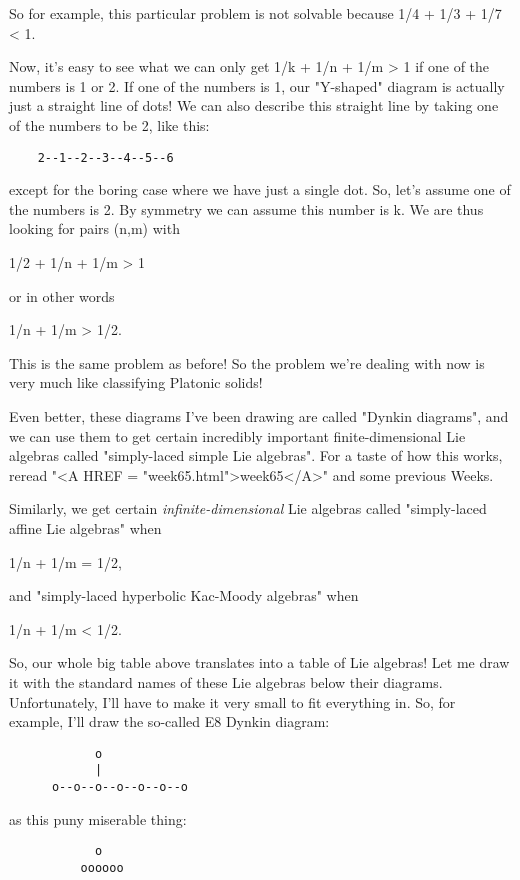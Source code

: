 So for example, this particular problem is not solvable because
1/4 + 1/3 + 1/7 < 1.

Now, it's easy to see what we can only get 1/k + 1/n + 1/m > 1 if one 
of the numbers is 1 or 2.  If one of the numbers is 1, our "Y-shaped"
diagram is actually just a straight line of dots!  We can also
describe this straight line by taking one of the numbers to be 2, like
this:
\begin{verbatim}
    2--1--2--3--4--5--6
\end{verbatim}
    
except for the boring case where we have just a single dot.  So, 
let's assume one of the numbers is 2.  By symmetry we can assume
this number is k.  We are thus looking for pairs (n,m) with 

1/2 + 1/n + 1/m > 1

or in other words

1/n + 1/m > 1/2.

This is the same problem as before!  So the problem we're dealing
with now is very much like classifying Platonic solids!  

Even better, these diagrams I've been drawing are called "Dynkin
diagrams", and we can use them to get certain incredibly important
finite-dimensional Lie algebras called "simply-laced simple Lie algebras".  
For a taste of how this works, reread "<A HREF = "week65.html">week65</A>" and some previous Weeks.  

Similarly, we get certain \emph{infinite-dimensional} Lie algebras 
called "simply-laced affine Lie algebras" when 

1/n + 1/m = 1/2,

and "simply-laced hyperbolic Kac-Moody algebras" when 

1/n + 1/m < 1/2.

So, our whole big table above translates into a table of Lie algebras!
Let me draw it with the standard names of these Lie algebras below their
diagrams.  Unfortunately, I'll have to make it very small to fit
everything in.  So, for example, I'll draw the so-called E8 Dynkin
diagram:

\begin{verbatim}
            o
            |
      o--o--o--o--o--o--o
\end{verbatim}
    
as this puny miserable thing:

\begin{verbatim}
            o
          oooooo
\end{verbatim}
    
